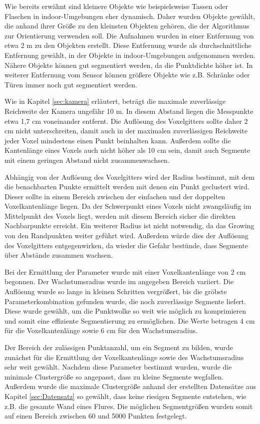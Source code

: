 Wie bereits erwähnt sind kleinere Objekte wie beispielsweise Tassen oder Flaschen in indoor-Umgebungen eher dynamisch. Daher wurden Objekte gewählt, die anhand ihrer Größe zu den kleinsten Objekten gehören, die  der Algorithmus zur Orientierung verwenden soll. Die Aufnahmen wurden in einer Entfernung von etwa 2 m zu den Objekten erstellt. Diese Entfernung wurde als durchschnittliche Entfernung gewählt, in der Objekte in indoor-Umgebungen aufgenommen werden. Nähere Objekte können gut segmentiert werden, da die Punktdichte höher ist. In weiterer Entfernung vom Sensor können größere Objekte wie z.B. Schränke oder Türen immer noch gut segmentiert werden. 

Wie in Kapitel \ref{sec:kamera} erläutert, beträgt die maximale zuverlässige Reichweite der Kamera ungefähr 10 m. In diesem Abstand liegen die Messpunkte etwa 1,7 cm voneinander entfernt. Die Auflösung des Voxelgitters sollte daher 2 cm nicht unterschreiten, damit auch in der maximalen zuverlässigen Reichweite jeder Voxel mindestens einen Punkt beinhalten kann. Außerdem sollte die Kantenlänge eines Voxels auch nicht höher als 10 cm sein, damit auch Segmente mit einem geringen Abstand nicht zusammenwachsen. 

Abhängig von der Auflösung des Voxelgitters wird der Radius bestimmt, mit dem die benachbarten Punkte ermittelt werden mit denen ein Punkt geclustert wird. Dieser sollte in einem Bereich zwischen der einfachen und der doppelten Voxelkantenlänge liegen. Da der Schwerpunkt eines Voxels nicht zwangsläufig im Mittelpunkt des Voxels liegt, werden mit diesem Bereich sicher die direkten Nachbarpunkte erreicht. Ein weiterer Radius ist nicht notwendig, da das Growing von den Randpunkten weiter geführt wird. Außerdem würde dies der Auflösung des Voxelgitters entgegenwirken, da wieder die Gefahr bestünde, dass Segmente über Abstände zusammen wachsen. 

Bei der Ermittlung der Parameter wurde mit einer Voxelkantenlänge von 2 cm begonnen. Der Wachstumsradius wurde im angegeben Bereich variiert. Die Auflösung wurde so lange in kleinen Schritten vergrößert, bis die gröbste Parameterkombination gefunden wurde, die noch zuverlässige Segmente liefert. Diese wurde gewählt, um die Punktwolke so weit wie  möglich zu komprimieren und somit eine effiziente Segmentierung zu ermöglichen. Die Werte betragen 4 cm für die  Voxelkantenlänge sowie 6 cm für den Wachstumsradius.

Der Bereich der zulässigen Punktanzahl, um ein Segment zu bilden, wurde zunächst für die Ermittlung der Voxelkantenlänge sowie des Wachstumsradius sehr weit gewählt. Nachdem diese Parameter bestimmt wurden, wurde die minimale Clustergröße so angepasst, dass zu kleine Segmente wegfallen. Außerdem wurde die maximale Clustergröße anhand der erstellten Datensätze aus Kapitel \ref{sec:Datensatz} so gewählt, dass keine riesigen Segmente entstehen, wie z.B. die gesamte Wand eines Flures. Die möglichen Segmentgrößen wurden somit auf einen Bereich zwischen 60 und 5000 Punkten festgelegt.  


